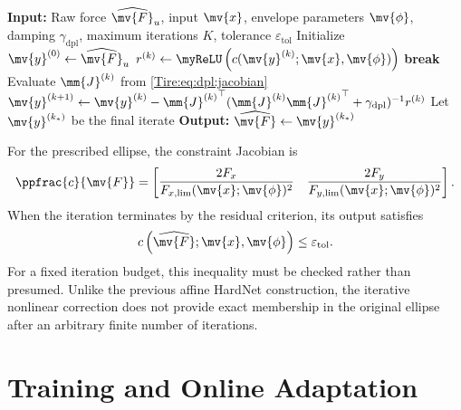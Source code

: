 \begin{algorithm}[!t]
	\caption{HardNet++ nonlinear combined-slip constraint enforcement}
	\label{Tire:alg:dpl}
	\begin{algorithmic}[1]
		\STATE \textbf{Input:} Raw force $\widehat{\mv{F}}_u$,
		input $\mv{x}$, envelope parameters $\mv{\phi}$,
		damping $\gamma_{\mathrm{dpl}}$, maximum iterations $K$,
		tolerance $\varepsilon_{\mathrm{tol}}$
		\STATE Initialize $\mv{y}^{(0)}\leftarrow\widehat{\mv{F}}_u$
		\STATE $r^{(k)}\leftarrow\myReLU\left(c(\mv{y}^{(k)};\mv{x},\mv{\phi})\right)$
		\STATE \textbf{break}
		\ENDIF
		\STATE Evaluate $\mm{J}^{(k)}$ from \eqref{Tire:eq:dpl:jacobian}
		\STATE $\mv{y}^{(k+1)}\leftarrow\mv{y}^{(k)}
			-{\mm{J}^{(k)}}^\top
			(\mm{J}^{(k)}{\mm{J}^{(k)}}^\top+\gamma_{\mathrm{dpl}})^{-1}r^{(k)}$
		\ENDFOR
		\STATE Let $\mv{y}^{(k_*)}$ be the final iterate
		\STATE \textbf{Output:}
		$\widehat{\mv{F}}\leftarrow\mv{y}^{(k_*)}$
	\end{algorithmic}
\end{algorithm}

For the prescribed ellipse, the constraint Jacobian is
\begin{equation}
	\label{Tire:eq:ellipse:jacobian}
	\ppfrac{c}{\mv{F}}
	=
	\begin{bmatrix}
		\dfrac{2F_x}{F_{x,\lim}(\mv{x};\mv{\phi})^2}
		 &
		\dfrac{2F_y}{F_{y,\lim}(\mv{x};\mv{\phi})^2}
	\end{bmatrix}
	.
\end{equation}
When the iteration terminates by the residual criterion, its output
satisfies
\begin{equation}
	\label{Tire:eq:feasibility:tolerance}
	c
	\left(
	\widehat{\mv{F}};\mv{x},\mv{\phi}
	\right)
	\leq
	\varepsilon_{\mathrm{tol}}
	.
\end{equation}
For a fixed iteration budget, this inequality must be checked rather
than presumed. Unlike the previous affine HardNet construction, the
iterative nonlinear correction does not provide exact membership in
the original ellipse after an arbitrary finite number of iterations.

\section{Training and Online Adaptation}
\label{Tire:sec:training}

